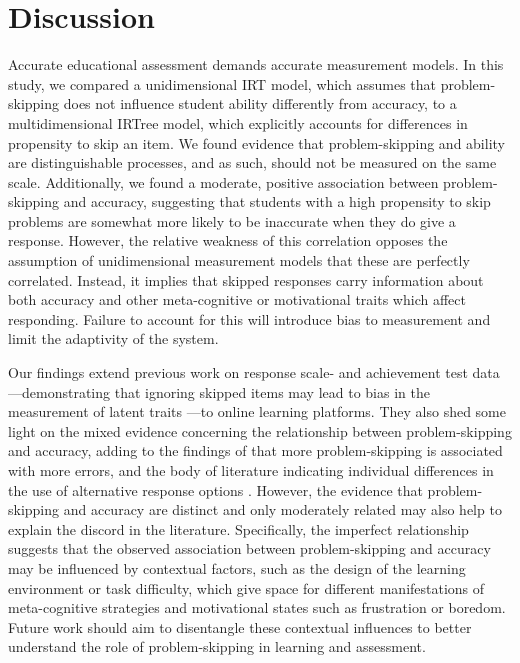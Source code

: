 \documentclass{edm_article}
\begin{document}
\section{Discussion}
Accurate educational assessment demands accurate measurement models. In this study, we compared a unidimensional IRT model, which assumes that problem-skipping does not influence student ability differently from accuracy, to a multidimensional IRTree model, which explicitly accounts for differences in propensity to skip an item. We found evidence that problem-skipping and ability are distinguishable processes, and as such, should not be measured on the same scale. Additionally, we found a moderate, positive association between problem-skipping and accuracy, suggesting that students with a high propensity to skip problems are somewhat more likely to be inaccurate when they do give a response. However, the relative weakness of this correlation opposes the assumption of unidimensional measurement models that these are perfectly correlated. Instead, it implies that skipped responses carry information about both accuracy and other meta-cognitive or motivational traits which affect responding. Failure to account for this will introduce bias to measurement and limit the adaptivity of the system. 

Our findings extend previous work on response scale- and achievement test data---demonstrating that ignoring skipped items may lead to bias in the measurement of latent traits \cite{holman2005modelling, pohl2014dealing, huang2020mixture, okumura2014empirical, debeer2017modeling}---to online learning platforms. They also shed some light on the mixed evidence concerning the relationship between problem-skipping and accuracy, adding to the findings of \cite{norum2024student} that more problem-skipping is associated with more errors, and the body of literature indicating individual differences in the use of alternative response options \cite{norum2024student, goldin2012learner, goldin2013hints}. However, the evidence that problem-skipping and accuracy are distinct and only moderately related may also help to explain the discord in the literature. Specifically, the imperfect relationship suggests that the observed association between problem-skipping and accuracy may be influenced by contextual factors, such as the design of the learning environment or task difficulty, which give space for different manifestations of meta-cognitive strategies and motivational states such as frustration or boredom. Future work should aim to disentangle these contextual influences to better understand the role of problem-skipping in learning and assessment. 
\end{document}

